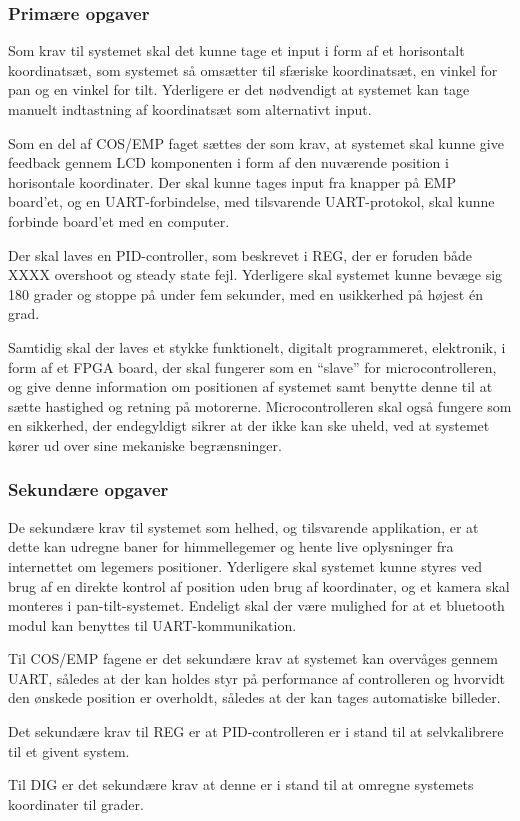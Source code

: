 \subsubsection{Primære opgaver}

Som krav til systemet skal det kunne tage et input i form af et horisontalt koordinatsæt, som systemet så omsætter til sfæriske koordinatsæt, en vinkel for pan og en vinkel for tilt. Yderligere er det nødvendigt at systemet kan tage manuelt indtastning af koordinatsæt som alternativt input.

Som en del af COS/EMP faget sættes der som krav, at systemet skal kunne give feedback gennem LCD komponenten i form af den nuværende position i horisontale koordinater. Der skal kunne tages input fra knapper på EMP board'et, og en UART-forbindelse, med tilsvarende UART-protokol, skal kunne forbinde board'et med en computer.

Der skal laves en PID-controller, som beskrevet i REG, der er foruden både XXXX overshoot og steady state fejl. Yderligere skal systemet kunne bevæge sig 180 grader og stoppe på under fem sekunder, med en usikkerhed på højest én grad.

Samtidig skal der laves et stykke funktionelt, digitalt programmeret, elektronik, i form af et FPGA board, der skal fungerer som en ``slave'' for microcontrolleren, og give denne information om positionen af systemet samt benytte denne til at sætte hastighed og retning på motorerne. Microcontrolleren skal også fungere som en sikkerhed, der endegyldigt sikrer at der ikke kan ske uheld, ved at systemet kører ud over sine mekaniske begrænsninger.

\subsubsection{Sekundære opgaver}

De sekundære krav til systemet som helhed, og tilsvarende applikation, er at dette kan udregne baner for himmellegemer og hente live oplysninger fra internettet om legemers positioner. Yderligere skal systemet kunne styres ved brug af en direkte kontrol af position uden brug af koordinater, og et kamera skal monteres i pan-tilt-systemet. Endeligt skal der være mulighed for at et bluetooth modul kan benyttes til UART-kommunikation.

Til COS/EMP fagene er det sekundære krav at systemet kan overvåges gennem UART, således at der kan holdes styr på performance af controlleren og hvorvidt den ønskede position er overholdt, således at der kan tages automatiske billeder.

Det sekundære krav til REG er at PID-controlleren er i stand til at selvkalibrere til et givent system.

Til DIG er det sekundære krav at denne er i stand til at omregne systemets koordinater til grader.